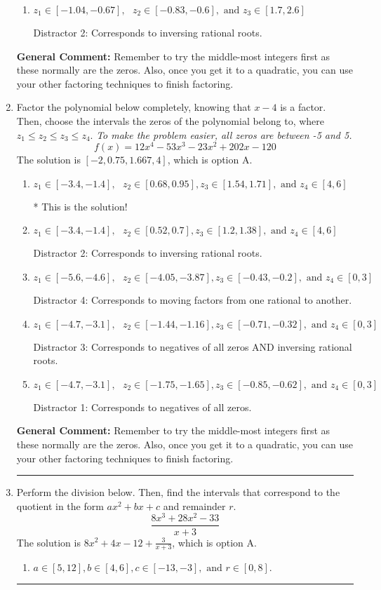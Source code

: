 \documentclass{extbook}[14pt]
\newcommand{\litem}[1]{\item #1

\rule{\textwidth}{0.4pt}}
\begin{document}
\begin{enumerate}
{\begin{enumerate}[label=\Alph*.]
 Distractor 1: Corresponds to negatives of all zeros.
\item \( z_1 \in [-1.04, -0.67], \text{   }  z_2 \in [-0.83, -0.6], \text{   and   } z_3 \in [1.7, 2.6] \)

 Distractor 2: Corresponds to inversing rational roots.
\end{enumerate}

\textbf{General Comment:} Remember to try the middle-most integers first as these normally are the zeros. Also, once you get it to a quadratic, you can use your other factoring techniques to finish factoring.
}
\litem{
Factor the polynomial below completely, knowing that $x -4$ is a factor. Then, choose the intervals the zeros of the polynomial belong to, where $z_1 \leq z_2 \leq z_3 \leq z_4$. \textit{To make the problem easier, all zeros are between -5 and 5.}
\[ f(x) = 12x^{4} -53 x^{3} -23 x^{2} +202 x -120 \]The solution is \( [-2, 0.75, 1.667, 4] \), which is option A.\begin{enumerate}[label=\Alph*.]
\item \( z_1 \in [-3.4, -1.4], \text{   }  z_2 \in [0.68, 0.95], z_3 \in [1.54, 1.71], \text{   and   } z_4 \in [4, 6] \)

* This is the solution!
\item \( z_1 \in [-3.4, -1.4], \text{   }  z_2 \in [0.52, 0.7], z_3 \in [1.2, 1.38], \text{   and   } z_4 \in [4, 6] \)

 Distractor 2: Corresponds to inversing rational roots.
\item \( z_1 \in [-5.6, -4.6], \text{   }  z_2 \in [-4.05, -3.87], z_3 \in [-0.43, -0.2], \text{   and   } z_4 \in [0, 3] \)

 Distractor 4: Corresponds to moving factors from one rational to another.
\item \( z_1 \in [-4.7, -3.1], \text{   }  z_2 \in [-1.44, -1.16], z_3 \in [-0.71, -0.32], \text{   and   } z_4 \in [0, 3] \)

 Distractor 3: Corresponds to negatives of all zeros AND inversing rational roots.
\item \( z_1 \in [-4.7, -3.1], \text{   }  z_2 \in [-1.75, -1.65], z_3 \in [-0.85, -0.62], \text{   and   } z_4 \in [0, 3] \)

 Distractor 1: Corresponds to negatives of all zeros.
\end{enumerate}

\textbf{General Comment:} Remember to try the middle-most integers first as these normally are the zeros. Also, once you get it to a quadratic, you can use your other factoring techniques to finish factoring.
}
\litem{
Perform the division below. Then, find the intervals that correspond to the quotient in the form $ax^2+bx+c$ and remainder $r$.
\[ \frac{8x^{3} +28 x^{2} -33}{x + 3} \]The solution is \( 8x^{2} +4 x -12 + \frac{3}{x + 3} \), which is option A.\begin{enumerate}[label=\Alph*.]
\item \( a \in [5, 12], b \in [4, 6], c \in [-13, -3], \text{ and } r \in [0, 8]. \)


\end{enumerate}}
\end{enumerate}
\end{document}
